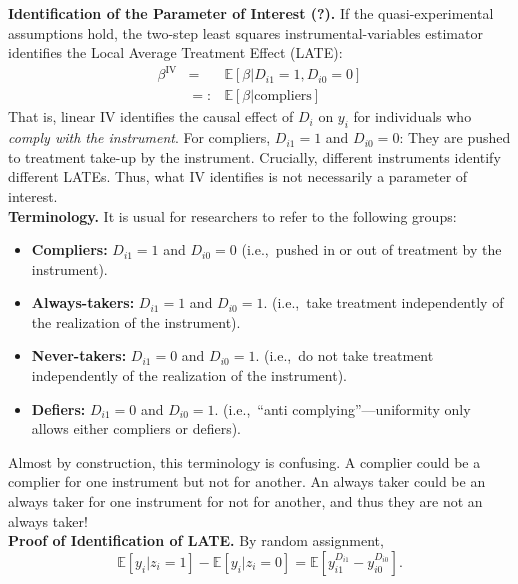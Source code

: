 \noindent \textbf{Identification of the Parameter of Interest (?).} If the quasi-experimental assumptions hold, the two-step least squares instrumental-variables estimator identifies the Local Average Treatment Effect (LATE): 
\begin{eqnarray}
\beta^{\text{IV}} &=&  \mathbb{E} \left[ \beta | D_{i1} = 1, D_{i0} = 0 \right] \nonumber \\
		         &=:& \mathbb{E} \left[ \beta | \text{compliers} \right]
\end{eqnarray}
\noindent That is, linear IV identifies the causal effect of $D_{i}$ on $y_{i}$ for individuals who \textit{comply with the instrument}. For compliers, $D_{i1} = 1$ and  $D_{i0} = 0$: They are pushed to treatment take-up by the instrument. Crucially, different instruments identify different LATEs. Thus, what IV identifies is not necessarily a parameter of interest.\\

\noindent \textbf{Terminology.} It is usual for researchers to refer to the following groups: 
\begin{itemize} 
\item \textbf{Compliers:} $D_{i1} = 1$ and $D_{i0} = 0$ (i.e.,\ pushed in or out of treatment by the instrument). 
\item \textbf{Always-takers:} $D_{i1} = 1$ and $D_{i0} = 1$. (i.e.,\ take treatment independently of the realization of the instrument).
\item \textbf{Never-takers:} $D_{i1} = 0$ and $D_{i0} = 1$. (i.e.,\ do not take treatment independently of the realization of the instrument).
\item \textbf{Defiers:} $D_{i1} = 0$ and $D_{i0} = 1$. (i.e.,\ ``anti complying''---uniformity only allows either compliers or defiers).
\end{itemize}

\noindent Almost by construction, this terminology is confusing. A complier could be a complier for one instrument but not for another. An always taker could be an always taker for one instrument for not for another, and thus they are not an always taker!\\

\bigskip
\noindent \textbf{Proof of Identification of LATE.} By random assignment, 
\begin{equation}
\mathbb{E} \left[ y_{i} | z_{i} = 1 \right] - \mathbb{E} \left[ y_{i} | z_{i} = 0 \right]  = \mathbb{E} \left[ y_{i1}^{D_{i1}} - y_{i0}^{D_{i0}} \right]. 
\end{equation} 

